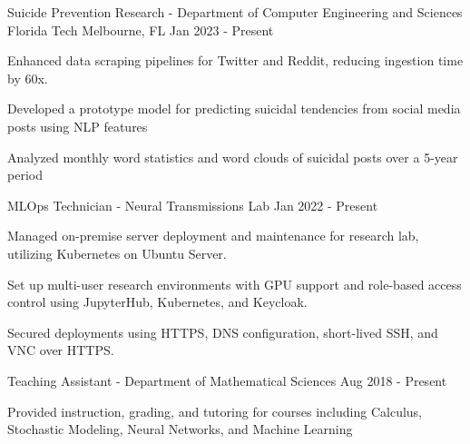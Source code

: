 \begin{cventries}
	\vspace{-1mm}
	\cventry
	{Suicide Prevention Research - Department of Computer Engineering and Sciences}
	{Florida Tech}
	{Melbourne, FL}
	{Jan 2023 - Present}
	{\begin{cvitems}
			\item {Enhanced data scraping pipelines for Twitter and Reddit, reducing ingestion time by 60x.}
			\item {Developed a prototype model for predicting suicidal tendencies from social media posts using NLP features}
			\item {Analyzed monthly word statistics and word clouds of suicidal posts over a 5-year period}
		\end{cvitems}}
	\vspace{1mm}
	\cventry
	{MLOps Technician - Neural Transmissions Lab}
	{}
	{}
	{Jan 2022 - Present}
	{\begin{cvitems}
			\item {Managed on-premise server deployment and maintenance for research lab, utilizing Kubernetes on Ubuntu Server.}
			\item {Set up multi-user research environments with GPU support and role-based access control using JupyterHub, Kubernetes, and Keycloak.}
			\item {Secured deployments using HTTPS, DNS configuration, short-lived SSH, and VNC over HTTPS.}
		\end{cvitems}}
	\vspace{1mm}
	\cventry
	{Teaching Assistant - Department of Mathematical Sciences}
	{}
	{}
	{Aug 2018 - Present}
	{\begin{cvitems}
			\item {Provided instruction, grading, and tutoring for courses including Calculus, Stochastic Modeling, Neural Networks, and Machine Learning}
		\end{cvitems}}

	\vspace{-1mm}


\end{cventries}